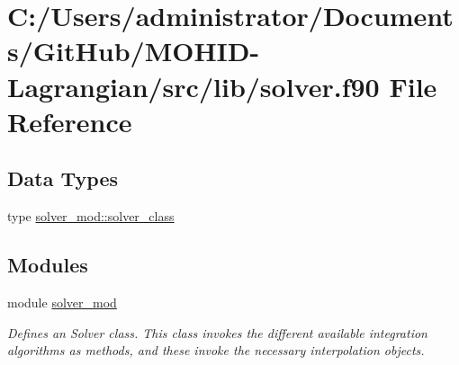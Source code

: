 \hypertarget{solver_8f90}{}\section{C\+:/\+Users/administrator/\+Documents/\+Git\+Hub/\+M\+O\+H\+I\+D-\/\+Lagrangian/src/lib/solver.f90 File Reference}
\label{solver_8f90}
\subsection*{Data Types}
\begin{DoxyCompactItemize}
\item 
type \mbox{\hyperlink{structsolver__mod_1_1solver__class}{solver\+\_\+mod\+::solver\+\_\+class}}
\end{DoxyCompactItemize}
\subsection*{Modules}
\begin{DoxyCompactItemize}
\item 
module \mbox{\hyperlink{namespacesolver__mod}{solver\+\_\+mod}}
\begin{DoxyCompactList}\small\item\em Defines an Solver class. This class invokes the different available integration algorithms as methods, and these invoke the necessary interpolation objects. \end{DoxyCompactList}\end{DoxyCompactItemize}
